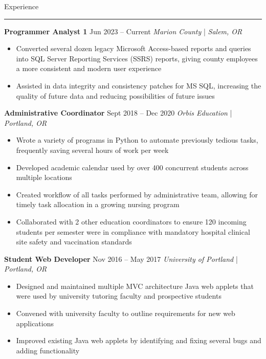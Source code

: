 \documentclass[11pt]{article}
\newcommand{\sectiontitle}[1]{
    \noindent\Large#1
    \newline
    \vspace{-0.18in}
    \hrule   
}
\newcommand{\occupation}[4]{
    \topitemspacing
    \normalsize
    \noindent\textbf{#1}
    \hfill
    \noindent#3
    \newline
    \noindent\textit{#2} | \textit{#4}
    \toplistspacing
}
\newcommand{\sectionendspace}{
    \vspace{0.1in}
}
\newcommand{\toplistspacing}{
    \vspace{0.04in}
}
\newcommand{\topitemspacing}{
    \vspace{0.1in}
}
\begin{document}
    \sectionendspace
    \sectiontitle{Experience}
    \occupation{Programmer Analyst 1}{Marion County}
    {Jun 2023 -- Current}
    {Salem, OR}
    \begin{itemize}[noitemsep,nolistsep]
        \item Converted several dozen legacy Microsoft Access-based reports and queries into SQL Server Reporting Services (SSRS) reports, giving county employees a more consistent and modern user experience 
        \item Assisted in data integrity and consistency patches for MS SQL, increasing the quality of future data and reducing possibilities of future issues
    \end{itemize}
    \occupation{Administrative Coordinator}{Orbis Education}
    {Sept 2018 -- Dec 2020}
    {Portland, OR}
    \begin{itemize}[noitemsep,nolistsep]
        \item Wrote a variety of programs in Python to automate previously tedious tasks, frequently saving several hours of work per week
        \item Developed academic calendar used by over 400 concurrent students across multiple locations
        \item Created workflow of all tasks performed by administrative team, allowing for timely task allocation in a growing nursing program
        \item Collaborated with 2 other education coordinators to ensure 120 incoming students per semester were in compliance with mandatory hospital clinical site safety and vaccination standards
    \end{itemize}
    \occupation{Student Web Developer}
    {University of Portland}
    {Nov 2016 -- May 2017}
    {Portland, OR}
    \begin{itemize}[noitemsep,nolistsep]
        \item Designed and maintained multiple MVC architecture Java web applets that were used by university tutoring faculty and prospective students
        \item Convened with university faculty to outline requirements for new web applications
        \item Improved existing Java web applets by identifying and fixing several bugs and adding functionality
    \end{itemize}
\end{document}
